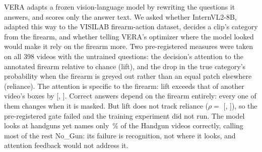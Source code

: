 VERA adapts a frozen vision-language model by rewriting the questions it answers, and scores only the answer text. We asked whether InternVL2-8B, adapted this way to the VISILAB firearm-action dataset, decides a clip's category from the firearm, and whether telling VERA's optimizer where the model looked would make it rely on the firearm more. Two pre-registered measures were taken on all 398 videos with the untrained questions: the decision's attention to the annotated firearm relative to chance (lift), and the drop in the true category's probability when the firearm is greyed out rather than an equal patch elsewhere (reliance). The attention is specific to the firearm: lift exceeds that of another video's boxes by  [, ]. Correct answers depend on the firearm entirely: every one of them changes when it is masked. But lift does not track reliance ($\rho=$  [, ]), so the pre-registered gate failed and the training experiment did not run. The model looks at handguns yet names only \,\% of the Handgun videos correctly, calling most of the rest No\_Gun: its failure is recognition, not where it looks, and attention feedback would not address it.
